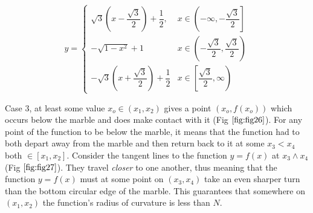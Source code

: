\begin{equation*}
    y = 
    \begin{cases}
        \sqrt{3} \left( x - \dfrac{\sqrt{3}}{2}\right) + \dfrac{1}{2}, 
        & x \in \left( -\infty, - \dfrac{\sqrt{3}}{2} \right]
        \\
        - \sqrt{1 - x^2} + 1
        & x \in \left( - \dfrac{\sqrt{3}}{2}, \dfrac{\sqrt{3}}{2} \right)
        \\
        - \sqrt{3} \left( x + \dfrac{\sqrt{3}}{2} \right) + \dfrac{1}{2}
        & x \in \left[ \dfrac{\sqrt{3}}{2}, \infty \right)
    \end{cases}
\end{equation*}

Case 3, at least some value $x_o \in (x_1, x_2)$ gives a point $(x_o, f(x_o))$ which occurs below the
marble and does make contact with it (Fig $\ref{fig:fig26}$). For any point of the function to be below the
marble, it means that the function had to both depart away from the marble and then return back to it at some
$x_3 < x_4$ both $\in [x_1, x_2]$. Consider the tangent lines to the function $y = f(x)$ at $x_3 \land x_4$ (Fig $\ref{fig:fig27}$). They travel \textit{closer} to one another, thus meaning that the function $y = f(x)$ must at some point on $(x_3, x_4)$ take an even sharper turn than the bottom circular edge of the marble. This guarantees that somewhere on $(x_1, x_2)$ the function’s radius of curvature is less than $N$.

